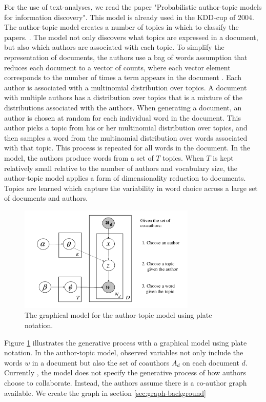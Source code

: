 

For the use of text-analyses, we read the paper "Probabilistic author-topic models for information discovery". This model is already used in the KDD-cup of 2004. The author-topic model creates a number of topics in which to classify the papers.  \cite{steyvers2004probabilistic}. The model not only discovers what topics are expressed in a document, but also which authors are associated with each topic. To simplify the representation of documents, the authors use a bag of words assumption that reduces each document to a vector of counts, where each vector element corresponds to the number of times a term appears in the document \cite{chowdhury2010introduction}. Each author is associated with a multinomial distribution over topics. A document with multiple authors has a distribution over topics that is a mixture of the distributions associated with the authors. When generating a document, an author is chosen at random for each individual word in the document. This author picks a topic from his or her multinomial distribution over topics, and then samples a word from the multinomial distribution over words associated with that topic. This process is repeated for all words in the document. In the model, the authors produce words from a set of $T$ topics. When $T$ is kept relatively small relative to the number of authors and vocabulary size, the author-topic model applies a form of dimensionality reduction to documents. Topics are learned which capture the variability in word choice across a large set of documents and authors. 

\begin{figure}[htb]
\begin{center}
	\centering
	\includegraphics[width=0.75\textwidth]{./Images/model.png}
	\caption{The graphical model for the author-topic
model using plate notation.\cite{steyvers2004probabilistic} \label{fig:model}}
\end{center}
\end{figure}

Figure \ref{fig:model} illustrates the generative process with a graphical model using plate notation. In the author-topic model, observed variables not only include the words $w$ in a document but also the set of coauthors $A_d$ on each document $d$. Currently , the model does not specify the generative process of how authors choose to collaborate. Instead, the authors assume there is a co-author graph available. We create the graph in section \ref{sec:graph-background}
